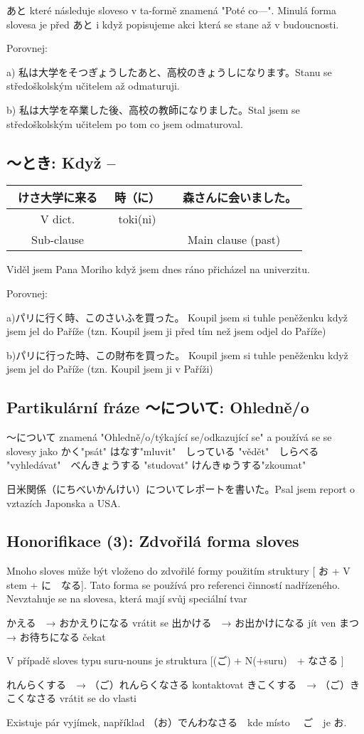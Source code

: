 あと které následuje sloveso v ta-formě znamená "Poté co---". Minulá forma slovesa je před あと i když popisujeme akci která se stane až v budoucnosti. 

Porovnej: 

a) 私は大学をそつぎょうしたあと、高校のきょうしになります。Stanu se středoškolským učitelem až odmaturuji.

b) 私は大学を卒業した後、高校の教師になりました。Stal jsem se středoškolským učitelem po tom co jsem odmaturoval.

\subsection{〜とき: Když --}
\begin{center}
\begin{tabular}{||c|c||c||}
\hline
けさ大学に来る　&時（に）&　森さんに会いました。\\
\hline
V dict.&toki(ni)&\\
Sub-clause&&Main clause (past)\\
\hline
\end{tabular}
\end{center}
Viděl jsem Pana Moriho když jsem dnes ráno přicházel na univerzitu.



Porovnej:

a)パリに行く時、このさいふを買った。 Koupil jsem si tuhle peněženku když jsem jel do Paříže (tzn. Koupil jsem ji před tím než jsem odjel do Paříže)

b)パリに行った時、この財布を買った。 Koupil jsem si tuhle peněženku když jsem jel do Paříže (tzn. Koupil jsem ji v Paříži)

\subsection{Partikulární fráze 〜について: Ohledně/o}
〜について znamená "Ohledně/o/týkající se/odkazující se" a používá se se slovesy jako かく"psát" はなす"mluvit"　しっている "vědět"　しらべる "vyhledávat"　べんきょうする "studovat" けんきゅうする"zkoumat"

日米関係（にちべいかんけい）についてレポートを書いた。Psal jsem report o vztazích Japonska a USA.

\subsection{Honorifikace (3): Zdvořilá forma sloves}

Mnoho sloves může být vloženo do zdvořilé formy použitím struktury [ お + V stem + に　なる]. Tato forma se používá pro referenci činností nadřízeného. Nevztahuje se na slovesa, která mají svůj speciální tvar

かえる　→  おかえりになる vrátit se
出かける　→  お出かけになる jít ven
まつ　→  お待ちになる čekat

V případě sloves typu suru-nouns je struktura [(ご) + N(+suru)　+ なさる ]

れんらくする　→   （ご）れんらくなさる kontaktovat
きこくする　→ （ご）きこくなさる vrátit se do vlasti

Existuje pár vyjímek, například （お）でんわなさる　kde místo 　ご　je お. 

